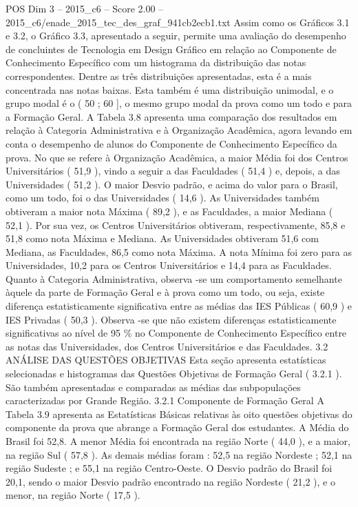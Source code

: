 \begin{textsample}{POS Dim 3 – 2015\_c6 – Score 2.00 – 2015\_c6/enade\_2015\_tec\_des\_graf\_941cb2ecb1.txt}
Assim como os Gráficos 3.1 e 3.2, o Gráfico 3.3, apresentado a seguir, permite uma avaliação do desempenho de concluintes de Tecnologia em Design Gráfico em relação ao Componente de Conhecimento Específico com um histograma da distribuição das notas correspondentes.
Dentre as três distribuições apresentadas, esta é a mais concentrada nas notas baixas.
Esta também é uma distribuição unimodal, e o grupo modal é o ( 50 ; 60 ], o mesmo grupo modal da prova como um todo e para a Formação Geral.
A Tabela 3.8 apresenta uma comparação dos resultados em relação à Categoria Administrativa e à Organização Acadêmica, agora levando em conta o desempenho de alunos do Componente de Conhecimento Específico da prova.
No que se refere à Organização Acadêmica, a maior Média foi dos Centros Universitários ( 51,9 ), vindo a seguir a das Faculdades ( 51,4 ) e, depois, a das Universidades ( 51,2 ).
O maior Desvio padrão, e acima do valor para o Brasil, como um todo, foi o das Universidades ( 14,6 ).
As Universidades também obtiveram a maior nota Máxima ( 89,2 ), e as Faculdades, a maior Mediana ( 52,1 ).
Por sua vez, os Centros Universitários obtiveram, respectivamente, 85,8 e 51,8 como nota Máxima e Mediana.
As Universidades obtiveram 51,6 com Mediana, as Faculdades, 86,5 como nota Máxima.
A nota Mínima foi zero para as Universidades, 10,2 para os Centros Universitários e 14,4 para as Faculdades.
Quanto à Categoria Administrativa, observa -se um comportamento semelhante àquele da parte de Formação Geral e à prova como um todo, ou seja, existe diferença estatisticamente significativa entre as médias das IES Públicas ( 60,9 ) e IES Privadas ( 50,3 ).
Observa -se que não existem diferenças estatisticamente significativas ao nível de 95 \% no Componente de Conhecimento Específico entre as notas das Universidades, dos Centros Universitários e das Faculdades. 3.2 ANÁLISE DAS QUESTÕES OBJETIVAS Esta seção apresenta estatísticas selecionadas e histogramas das Questões Objetivas de Formação Geral ( 3.2.1 ).
São também apresentadas e comparadas as médias das subpopulações caracterizadas por Grande Região. 3.2.1 Componente de Formação Geral A Tabela 3.9 apresenta as Estatísticas Básicas relativas às oito questões objetivas do componente da prova que abrange a Formação Geral dos estudantes.
A Média do Brasil foi 52,8.
A menor Média foi encontrada na região Norte ( 44,0 ), e a maior, na região Sul ( 57,8 ).
As demais médias foram : 52,5 na região Nordeste ; 52,1 na região Sudeste ; e 55,1 na região Centro-Oeste.
O Desvio padrão do Brasil foi 20,1, sendo o maior Desvio padrão encontrado na região Nordeste ( 21,2 ), e o menor, na região Norte ( 17,5 ).

\end{textsample}

